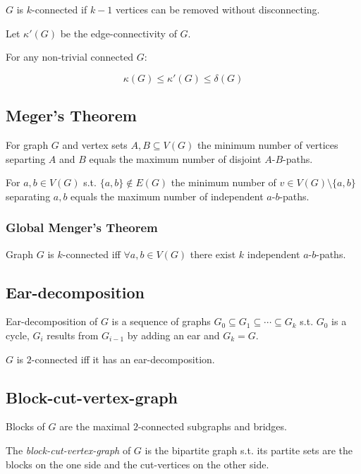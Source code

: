 $G$ is $k$-connected if $k-1$ vertices can be removed without disconnecting.

Let $\kappa'(G)$ be the edge-connectivity of $G$.

For any non-trivial connected $G$:

$$\kappa(G) \leq \kappa'(G) \leq \delta(G)$$

\subsection*{Meger's Theorem}

For graph $G$ and vertex sets $A,B \subseteq V(G)$ the minimum number of vertices separting $A$ and $B$ equals the maximum number of disjoint $A$-$B$-paths.

\spacing

For $a, b \in V(G)$ s.t. $\{a,b\} \notin E(G)$ the minimum number of $v \in V(G)\setminus\{a,b\}$ separating $a, b$ equals the maximum number of independent $a$-$b$-paths.

\subsubsection*{Global Menger's Theorem}

Graph $G$ is $k$-connected iff $\forall a,b \in V(G)$ there exist $k$ independent $a$-$b$-paths.

\subsection*{Ear-decomposition}

Ear-decomposition of $G$ is a sequence of graphs $G_0 \subseteq G_1 \subseteq \cdots \subseteq G_k$ s.t. $G_0$ is a cycle, $G_i$ results from $G_{i-1}$ by adding an ear and $G_k = G$.

\spacing

$G$ is $2$-connected iff it has an ear-decomposition.

\subsection*{Block-cut-vertex-graph}

Blocks of $G$ are the maximal $2$-connected subgraphs and bridges.

The \emph{block-cut-vertex-graph} of $G$ is the bipartite graph s.t. its partite sets are the blocks on the one side and the cut-vertices on the other side.

\spacing

